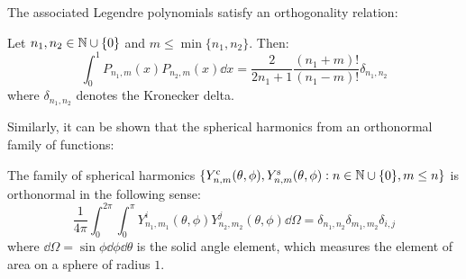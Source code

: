 \documentclass[../main.tex]{subfiles}
\begin{document}
The associated Legendre polynomials satisfy an orthogonality relation:
\begin{lemma}\label{lem:ortho_asso_legendre}
  Let $n_1,n_2\in\mathbb{N}\cup\{0\}$ and $m\leq \min\{n_1,n_2\}$. Then:
  \begin{equation}
    \int_0^1 P_{n_1,m}(x) P_{n_2,m}(x) \dd{x}=\frac{2}{2n_1+1}\frac{(n_1+m)!}{(n_1-m)!} \delta_{n_1,n_2}
  \end{equation}
  where $\delta_{n_1,n_2}$ denotes the Kronecker delta.
\end{lemma}
Similarly, it can be shown that the spherical harmonics from an orthonormal family of functions:
\begin{proposition}
  The family of spherical harmonics $\{Y_{n,m}^{\mathrm{c}}(\theta,\phi),Y_{n,m}^{\mathrm{s}}(\theta,\phi):n\in\mathbb{N}\cup\{0\},m\leq n\}$ is orthonormal in the following sense:
  \begin{equation}\label{eq:ortho_spherical_harmonics}
    \frac{1}{4\pi}\int_0^{2\pi}\int_0^\pi Y_{n_1,m_1}^i(\theta,\phi) Y_{n_2,m_2}^j(\theta,\phi)\dd\Omega=\delta_{n_1,n_2}\delta_{m_1,m_2}\delta_{i,j}
  \end{equation}
  where $\dd\Omega=\sin\phi\dd{\phi}\dd{\theta}$ is the solid angle element, which measures the element of area on a sphere of radius $1$.
\end{proposition}
\end{document}
